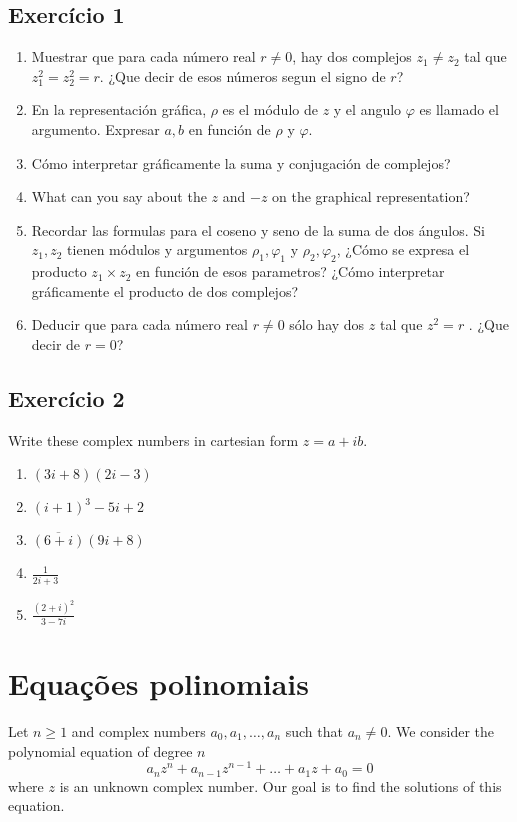 \subsection*{Exercício 1}

\begin{enumerate}
\item Muestrar que para cada número real $r \neq 0$, hay dos complejos
  $z_1 \neq z_2$ tal que $z_1^2 = z_2^2 = r$. ¿Que decir de esos números segun
  el signo de $r$?
\item En la representación gráfica, $\rho$ es el módulo de $z$ y el angulo
  $\varphi$ es llamado el argumento. Expresar $a, b$
  en función de $\rho$ y $\varphi$.
\item Cómo interpretar gráficamente la suma y conjugación de complejos?
\item What can you say about the $z$ and $-z$ on the graphical representation?
\item Recordar las formulas para el coseno y seno de la suma de dos ángulos.
  Si $z_1, z_2$ tienen módulos y argumentos $\rho_1, \varphi_1$ y
  $\rho_2, \varphi_2$, ¿Cómo se expresa el producto $z_1 \times z_2$ en función
  de esos parametros? ¿Cómo interpretar gráficamente el producto de dos
  complejos?
\item Deducir que para cada número real $r \neq 0$ sólo hay dos $z$ tal
  que $z^2 = r$ . ¿Que decir de $r=0$?
\end{enumerate}

\subsection*{Exercício 2}

Write these complex numbers in cartesian form $z=a+ib$.

\begin{enumerate}
\item ${(3i+8)}{(2i-3)}$
\item ${(i+1)}^3-5i+2$
\item $\overline{(6+i)}{(9i+8)}$
\item $\frac{1}{2i+3}$
\item $\frac{{(2+i)}^2}{3-7i}$
\end{enumerate}

\section{Equações polinomiais}

Let $n \geq 1$ and complex numbers $a_0, a_1, \dots, a_n$ such that $a_n\neq0$.
We consider the polynomial equation of degree $n$
$$
a_n z^n + a_{n-1} z^{n-1} + \dots + a_1 z + a_0 = 0
$$
where $z$ is an unknown complex number. Our goal is to find the solutions of
this equation.

